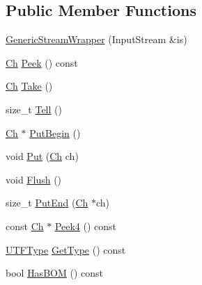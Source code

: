 \subsection*{Public Member Functions}
\begin{DoxyCompactItemize}
\item 
\mbox{\hyperlink{classrapidjson_1_1_generic_stream_wrapper_ac04401f8176175ddf758848ddfdb6cb5}{Generic\+Stream\+Wrapper}} (Input\+Stream \&is)
\item 
\mbox{\hyperlink{classrapidjson_1_1_generic_stream_wrapper_ac07ed61df8db2bd4a5e713e613b06bdb}{Ch}} \mbox{\hyperlink{classrapidjson_1_1_generic_stream_wrapper_a0a0a9ee10cf6ab4f58cbb7e261d679fa}{Peek}} () const
\item 
\mbox{\hyperlink{classrapidjson_1_1_generic_stream_wrapper_ac07ed61df8db2bd4a5e713e613b06bdb}{Ch}} \mbox{\hyperlink{classrapidjson_1_1_generic_stream_wrapper_a78083bbd93f63183f51b49d1cd0c445f}{Take}} ()
\item 
size\+\_\+t \mbox{\hyperlink{classrapidjson_1_1_generic_stream_wrapper_ae7c6c1b49dad4488906c27bc56bf04a5}{Tell}} ()
\item 
\mbox{\hyperlink{classrapidjson_1_1_generic_stream_wrapper_ac07ed61df8db2bd4a5e713e613b06bdb}{Ch}} $\ast$ \mbox{\hyperlink{classrapidjson_1_1_generic_stream_wrapper_ac6c6dcbc789147e1caab79561a10934a}{Put\+Begin}} ()
\item 
void \mbox{\hyperlink{classrapidjson_1_1_generic_stream_wrapper_a6d0412d9c6ca4b025a0ffb7268264549}{Put}} (\mbox{\hyperlink{classrapidjson_1_1_generic_stream_wrapper_ac07ed61df8db2bd4a5e713e613b06bdb}{Ch}} ch)
\item 
void \mbox{\hyperlink{classrapidjson_1_1_generic_stream_wrapper_a7c9f0b055206530559d5aa167672f592}{Flush}} ()
\item 
size\+\_\+t \mbox{\hyperlink{classrapidjson_1_1_generic_stream_wrapper_abff782cf275f8f4151a115affe1d815e}{Put\+End}} (\mbox{\hyperlink{classrapidjson_1_1_generic_stream_wrapper_ac07ed61df8db2bd4a5e713e613b06bdb}{Ch}} $\ast$ch)
\item 
const \mbox{\hyperlink{classrapidjson_1_1_generic_stream_wrapper_ac07ed61df8db2bd4a5e713e613b06bdb}{Ch}} $\ast$ \mbox{\hyperlink{classrapidjson_1_1_generic_stream_wrapper_a9478f917376bf218b104fc75e02fd1f7}{Peek4}} () const
\item 
\mbox{\hyperlink{namespacerapidjson_a4aacabc0f8cea1cd628f466d890773eb}{U\+T\+F\+Type}} \mbox{\hyperlink{classrapidjson_1_1_generic_stream_wrapper_a15b67cf080337745d7bd3bf4988eed7a}{Get\+Type}} () const
\item 
bool \mbox{\hyperlink{classrapidjson_1_1_generic_stream_wrapper_a3bcfb0e4e74a0cf692bf4e7042106b8a}{Has\+B\+OM}} () const
\end{DoxyCompactItemize}

